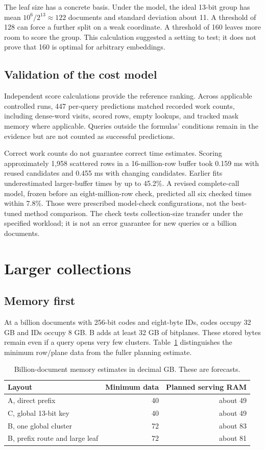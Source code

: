 \documentclass[11pt,a4paper]{article}
\begin{document}
The leaf size has a concrete basis. Under the model, the ideal 13-bit group has mean
$10^6/2^{13}\approx122$ documents and standard deviation about 11. A threshold of 128 can
force a further split on a weak coordinate. A threshold of 160 leaves more room to score
the group. This calculation suggested a setting to test; it does not prove that 160 is
optimal for arbitrary embeddings.

\subsection{Validation of the cost model}
Independent score calculations provide the reference ranking. Across applicable controlled
runs, 447 per-query predictions matched recorded work counts, including dense-word visits,
scored rows, empty lookups, and tracked mask memory where applicable. Queries outside the
formulas' conditions remain in the evidence but are not counted as successful predictions.

Correct work counts do not guarantee correct time estimates. Scoring approximately 1,958
scattered rows in a 16-million-row buffer took 0.159 ms with reused candidates and 0.455 ms
with changing candidates. Earlier fits underestimated larger-buffer times by up to 45.2\%.
A revised complete-call model, frozen before an eight-million-row check, predicted all six
checked times within 7.8\%. Those were prescribed model-check configurations, not the
best-tuned method comparison. The check tests collection-size transfer under the specified
workload; it is not an error guarantee for new queries or a billion documents.

\newpage
\section{Larger collections}
\subsection{Memory first}
At a billion documents with 256-bit codes and eight-byte IDs, codes occupy 32 GB and IDs
occupy 8 GB. B adds at least 32 GB of bitplanes. These stored bytes remain even if a query
opens very few clusters. Table~\ref{tab:ram} distinguishes the minimum row/plane data from
the fuller planning estimate.

\begin{table}[h]\centering
\caption{Billion-document memory estimates in decimal GB. These are forecasts.}
\label{tab:ram}
\begin{tabular}{@{}lrr@{}}\toprule
Layout & Minimum data & Planned serving RAM\\\midrule
A, direct prefix & 40 & about 49\\
C, global 13-bit key & 40 & about 49\\
B, one global cluster & 72 & about 83\\
B, prefix route and large leaf & 72 & about 81\\\bottomrule
\end{tabular}
\end{table}
\end{document}
